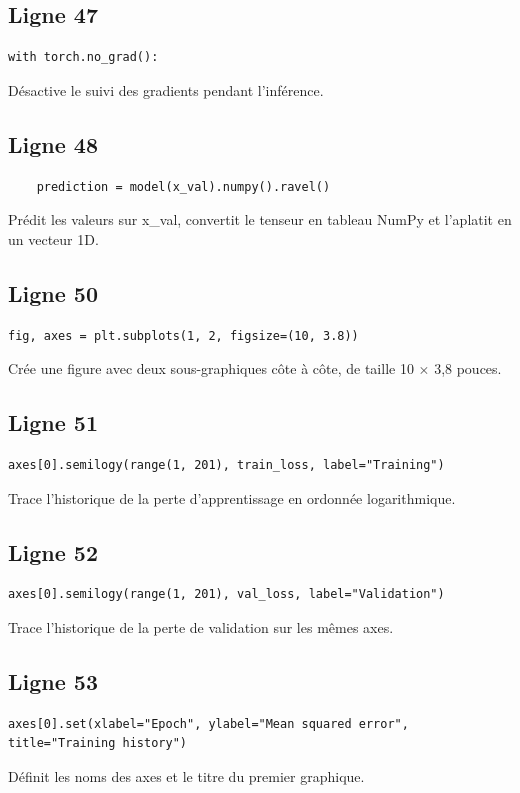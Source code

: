 \documentclass[11pt,a4paper]{article}
\begin{document}
\subsection*{Ligne 47}
\begin{lstlisting}
with torch.no_grad():
\end{lstlisting}
Désactive le suivi des gradients pendant l'inférence.

\subsection*{Ligne 48}
\begin{lstlisting}
    prediction = model(x_val).numpy().ravel()
\end{lstlisting}
Prédit les valeurs sur x\_val, convertit le tenseur en tableau NumPy et l'aplatit en un vecteur 1D.

\subsection*{Ligne 50}
\begin{lstlisting}
fig, axes = plt.subplots(1, 2, figsize=(10, 3.8))
\end{lstlisting}
Crée une figure avec deux sous-graphiques côte à côte, de taille 10 $\times$ 3,8 pouces.

\subsection*{Ligne 51}
\begin{lstlisting}
axes[0].semilogy(range(1, 201), train_loss, label="Training")
\end{lstlisting}
Trace l'historique de la perte d'apprentissage en ordonnée logarithmique.

\subsection*{Ligne 52}
\begin{lstlisting}
axes[0].semilogy(range(1, 201), val_loss, label="Validation")
\end{lstlisting}
Trace l'historique de la perte de validation sur les mêmes axes.

\subsection*{Ligne 53}
\begin{lstlisting}
axes[0].set(xlabel="Epoch", ylabel="Mean squared error", title="Training history")
\end{lstlisting}
Définit les noms des axes et le titre du premier graphique.
\end{document}
